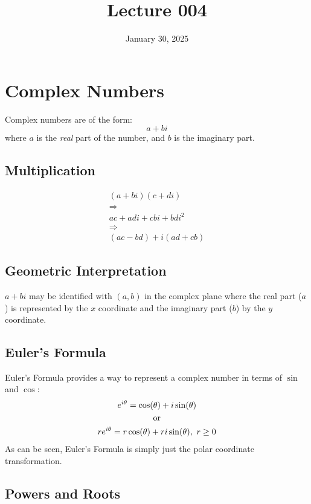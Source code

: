 \documentclass[12pt]{article}
\title{Lecture 004}
\date{January 30, 2025}
\begin{document}
\newpage
\section{Complex Numbers}
\label{sec:complexNumbers}

Complex numbers are of the form:
\begin{equation*}
  a + bi
\end{equation*}
where $a$ is the \textit{real} part of the number, and $b$ is the imaginary part.

\subsection{Multiplication}
\label{ssec:multiplication}
\begin{gather*}
  (a+bi)(c+di) \\
  \Rightarrow \\
  ac + adi + cbi + bdi^2 \\
  \Rightarrow \\
  (ac-bd)+i(ad+cb)
\end{gather*}

\subsection{Geometric Interpretation}
\label{ssec:geometricInterpretation}

$a+bi$ may be identified with $(a,b)$ in the complex plane where the real part ($a$) is represented by the $x$ coordinate and the imaginary part ($b$) by the $y$ coordinate.

\subsection{Euler's Formula}
\label{ssec:eulersFormula}

Euler's Formula provides a way to represent a complex number in terms of $\sin$ and $\cos$:
\begin{gather*}
  e^{i\theta} = \cos(\theta) + i\sin(\theta) \\
  \textup{or} \\
  re^{i\theta} = r\cos(\theta) + ri\sin(\theta),\ r \ge 0
\end{gather*}
As can be seen, Euler's Formula is simply just the polar coordinate transformation.

\subsection{Powers and Roots}
\label{ssec:powersAndRoots}
\end{document}
